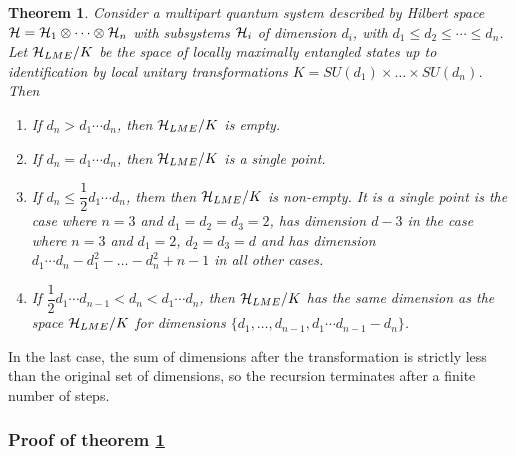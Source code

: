 \documentclass[12pt]{article}
\newtheorem{theorem}{Theorem}[section]
\theoremstyle{definition}
\begin{document}
\begin{theorem}\label{thm.States}
Consider a multipart quantum system described by Hilbert space ${\cal H} = {\cal H}_1 \otimes \cdots \otimes {\cal H}_n$ with subsystems ${\cal H}_i$ of dimension $d_i$, with  $d_1 \le d_2 \leqslant \cdots \leqslant d_n$. Let ${\cal H}_{LME}/K$ be the space of locally maximally entangled states up to identification by local unitary transformations $K = SU(d_1) \times \dots \times SU(d_n)$. Then
\begin{enumerate}

\item
If $d_n > d_1 \cdots d_n$, then ${\cal H}_{LME}/K$ is empty.

\item
If $d_n = d_1 \cdots d_n$, then ${\cal H}_{LME}/K$ is a single point.

\item
If $d_n \le \dfrac{1}{2} d_1 \cdots d_n$, them
then ${\cal H}_{LME}/K$ is non-empty.
It is a single point is the case where $n = 3$ and $d_1 = d_2 = d_3 = 2$,
has dimension $d - 3$ in the case where $n = 3$ and $d_1 = 2$, $d_2 = d_3 = d$
and has dimension $d_1 \cdots d_n -
d_1^2 - \dots - d_n^2 + n - 1$ in all other cases.

\item
If $\dfrac{1}{2} d_1 \cdots d_{n-1} < d_n < d_1 \cdots d_n$,
then ${\cal H}_{LME}/K$ has the same dimension as the space ${\cal H}_{LME}/K$ for dimensions $\{d_1,\dots,d_{n-1}, d_1 \cdots d_{n-1} - d_n\}$.
\end{enumerate}
\end{theorem}
In the last case, the sum of dimensions after the transformation is strictly less than the original set of dimensions, so the recursion terminates after a finite number of steps.

\subsubsection*{Proof of theorem \ref{thm.States}}
\end{document}
